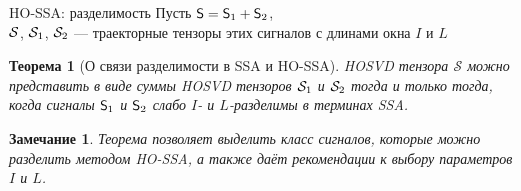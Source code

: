 \documentclass[pdf, unicode, 9pt, notheorems, handout]{beamer}
\newtheorem{theorem}{Теорема}
\newtheorem{remark}{Замечание}
\begin{document}
    \begin{frame}{HO-SSA: разделимость}
        Пусть $\mathsf{S} = \mathsf{S}_1 + \mathsf{S}_2$,\\ 
        $\mathcal{S}$, $\mathcal{S}_1$, $\mathcal{S}_2$ --- траекторные тензоры этих сигналов с длинами окна $I$ и $L$
        \begin{theorem}[О связи разделимости в SSA и HO-SSA]
            \textup{HOSVD} тензора $\mathcal{S}$ можно представить в виде суммы \textup{HOSVD}
            тензоров $\mathcal{S}_1$ и $\mathcal{S}_2$ тогда и только тогда, когда сигналы 
            $\mathsf{S}_1$ и $\mathsf{S}_2$ слабо $I$- и $L$-разделимы в терминах \textup{SSA}.
        \end{theorem}
        \vspace{0.4cm}
        \begin{remark}
            Теорема позволяет выделить класс сигналов, которые можно разделить методом \textup{HO-SSA},
            а также даёт рекомендации к выбору параметров $I$ и $L$.
        \end{remark}
    \end{frame}
    
    
\end{document}
